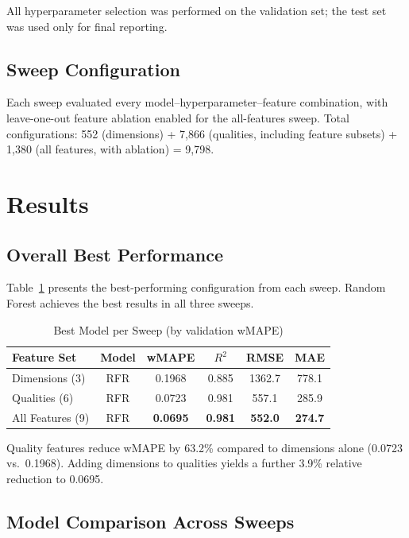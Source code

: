 \documentclass[conference]{IEEEtran}
\begin{document}
All hyperparameter selection was performed on the validation set; the test set was used only for final reporting.

\subsection{Sweep Configuration}
Each sweep evaluated every model--hyperparameter--feature combination, with leave-one-out feature ablation enabled for the all-features sweep. Total configurations: 552 (dimensions) + 7,866 (qualities, including feature subsets) + 1,380 (all features, with ablation) = 9,798.

\section{Results}

\subsection{Overall Best Performance}

Table~\ref{tab:best_overall} presents the best-performing configuration from each sweep. Random Forest achieves the best results in all three sweeps.

\begin{table}[htbp]
\caption{Best Model per Sweep (by validation wMAPE)}
\begin{center}
\begin{tabular}{lccccc}
\toprule
\textbf{Feature Set} & \textbf{Model} & \textbf{wMAPE} & \textbf{$R^2$} & \textbf{RMSE} & \textbf{MAE} \\
\midrule
Dimensions (3) & RFR & 0.1968 & 0.885 & 1362.7 & 778.1 \\
Qualities (6) & RFR & 0.0723 & 0.981 & 557.1 & 285.9 \\
All Features (9) & RFR & \textbf{0.0695} & \textbf{0.981} & \textbf{552.0} & \textbf{274.7} \\
\bottomrule
\end{tabular}
\label{tab:best_overall}
\end{center}
\end{table}

Quality features reduce wMAPE by 63.2\% compared to dimensions alone (0.0723 vs.\ 0.1968). Adding dimensions to qualities yields a further 3.9\% relative reduction to 0.0695.

\subsection{Model Comparison Across Sweeps}
\end{document}
